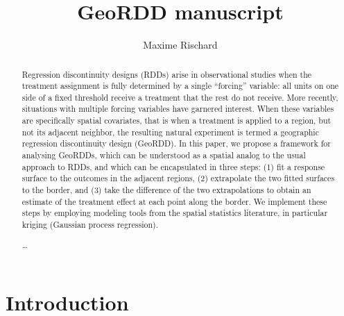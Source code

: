 \documentclass[letter]{article}
\title{GeoRDD manuscript}
\author{Maxime Rischard}
\begin{document}
    
    
    
    \maketitle
    
    
	\tableofcontents


    





\begin{abstract}
    	Regression discontinuity designs (RDDs) arise in observational studies when the treatment assignment is fully determined by a single ``forcing'' variable: all units on one side of a fixed threshold receive a treatment that the rest do not receive.
More recently, situations with multiple forcing variables have garnered interest.
When these variables are specifically spatial covariates, that is when a treatment is applied to a region, but not its adjacent neighbor, the resulting natural experiment is termed a geographic regression discontinuity design (GeoRDD).
In this paper, we propose a framework for analysing GeoRDDs, which can be understood as a spatial analog to the usual approach to RDDs, and which can be encapsulated in three steps:
(1) fit a response surface to the outcomes in the adjacent regions,
(2) extrapolate the two fitted surfaces to the border, and
(3) take the difference of the two extrapolations to obtain an estimate of the treatment effect at each point along the border.
We implement these steps by employing modeling tools from the spatial statistics literature, in particular kriging (Gaussian process regression).

\ldots{}
    

\end{abstract}
    	\section{Introduction}\label{introduction}
\end{document}
